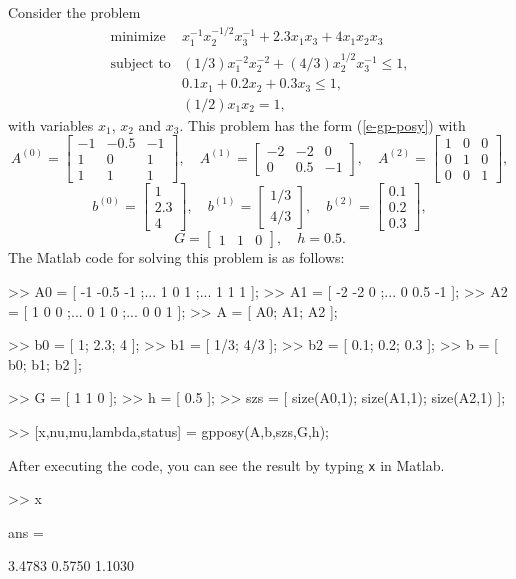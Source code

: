 \documentclass[12pt]{article}
\begin{document}
Consider the problem
\[ \label{e-gp-posy-example}
\begin{array}{ll}
\mbox{minimize} & x_1^{-1} x_2^{-1/2} x_3^{-1} + 2.3 x_1 x_3 + 4 x_1 x_2 x_3 \\
\mbox{subject to}
& (1/3)x_1^{-2}x_2^{-2} + (4/3) x_2^{1/2} x_3^{-1} \leq 1,\\
& 0.1x_1+0.2x_2+0.3x_3 \leq 1,\\
& (1/2)x_1 x_2 = 1,
\end{array}
\]
with variables $x_1$, $x_2$ and $x_3$.
This problem has the form (\ref{e-gp-posy}) with
\[
A^{(0)} = \left[\begin{array}{ccc}
-1 &  -0.5 &  -1 \\
1 &     0 &   1 \\
1 &     1 &   1
\end{array}\right],
\quad
A^{(1)} = \left[\begin{array}{ccc}
-2 &    -2 &   0 \\
0 &   0.5 &  -1
\end{array}\right],
\quad
A^{(2)} = \left[\begin{array}{ccc}
1 &     0 &   0 \\
0 &     1 &   0 \\
0 &     0 &   1
\end{array}\right],
\]
\[
b^{(0)} = \left[\begin{array}{c}
1 \\ 2.3 \\ 4
\end{array}\right],
\quad
b^{(1)} = \left[\begin{array}{c}
1/3 \\ 4/3
\end{array}\right],
\quad
b^{(2)} = \left[\begin{array}{c}
0.1 \\ 0.2 \\ 0.3
\end{array}\right],
\]
\[
G = \left[\begin{array}{ccc}
1 &  1 &  0
\end{array}\right],
\quad
h = 0.5 .
\]
The Matlab code for solving this problem is as follows:
\begin{code}

>> A0  = [  -1 -0.5   -1 ;...
         1    0    1 ;...
         1    1    1 ];
>> A1  = [  -2   -2    0 ;...
         0  0.5   -1 ];
>> A2  = [   1    0    0 ;...
         0    1    0 ;...
         0    0    1 ];
>> A   = [  A0;  A1;  A2 ];

>> b0  = [   1; 2.3;   4 ];
>> b1  = [ 1/3; 4/3 ];
>> b2  = [ 0.1; 0.2; 0.3 ];
>> b   = [  b0;  b1;  b2 ];

>> G   = [   1    1    0 ];
>> h   = [ 0.5 ];
>> szs = [ size(A0,1); size(A1,1); size(A2,1) ]; %

>> [x,nu,mu,lambda,status] = gpposy(A,b,szs,G,h);
\end{code}
After executing the code, you can see the result by typing \verb+x+ in Matlab.
\begin{code}
>> x

ans =

3.4783
0.5750
1.1030
\end{code}


\end{document}
